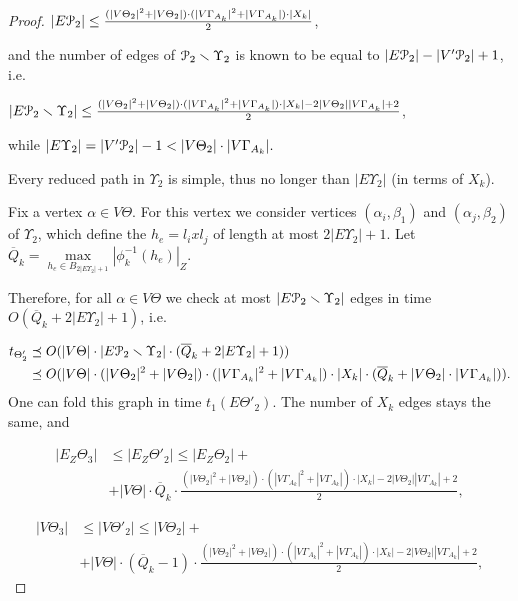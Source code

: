 \documentclass[a4paper,12pt]{article}
\renewcommand{\a}{\alpha }
\renewcommand{\b}{\beta }
\newcommand{\G}{\Gamma }
\newcommand{\T}{\Theta }
\newcommand{\U}{\Upsilon }
\newcommand{\cP}{{\cal{P}}}
\numberwithin{equation}{section}
\numberwithin{figure}{section}
\begin{document}
\begin{proof}
$|E\cP_2| \le \frac{(|V\T_2|^2+|V\T_2|)\cdot
(|V\G_{A_k}|^2+|V\G_{A_k}|) \cdot |X_k|}{2}$,

and the number of edges of $\cP_2 \smallsetminus \U_2$ is known to
be equal to $|E\cP_2| - |V'\cP_2|+1$, i.e.

$|E\cP_2\smallsetminus \U_2| \le \frac{(|V\T_2|^2+|V\T_2|)\cdot
(|V\G_{A_k}|^2+|V\G_{A_k}|) \cdot |X_k| -2|V\T_2||V\G_{A_k}|+2
}{2}$,

while $|E \U_2| = |V'\cP_2| - 1 < |V\T_2|\cdot |V \G_{A_k}|.$

Every reduced path in $\U_2$ is simple, thus no longer than
$|E\U_2|$ (in terms of $X_k$).

Fix a vertex $\a \in V\T$. For this vertex we consider vertices
$(\a_i,\b_1)$ and $(\a_j,\b_2)$ of $\U_2$, which define the
$h_e=l_i x l_j$ of length at most $2 |E \U_2| +1$. Let
$\overline{Q}_k=\mathop{max}\limits_{h_e \in B_{2|E \U_2|
+1}}|\phi^{-1}_k(h_e)|_Z$.

Therefore, for all $\a \in V\T$ we check at most
$|E\cP_2\smallsetminus \U_2|$ edges in time $O(\overline{Q}_k+2 |E
\U_2| +1)$, i.e.


\begin{equation}\label{theta'2}
\begin{split}
t_{\T'_2} &\preceq O(|V\T|\cdot |E\cP_2\smallsetminus \U_2|\cdot
(\overline{Q}_k+2 |E \U_2| +1))\\ &\preceq O(|V\T|\cdot
(|V\T_2|^2+|V\T_2|)\cdot (|V\G_{A_k}|^2+|V\G_{A_k}|) \cdot |X_k|
\cdot (\overline{Q}_k+|V\T_2|\cdot |V \G_{A_k}|)).
\end{split}
\end{equation}
One can fold this graph in time $t_1(E\T'_2)$. The number of $X_k$
edges stays the same, and

\begin{equation}\label{eztheta3}
\begin{split}
|E_Z\T_3| &\le |E_Z\T'_2|\le |E_Z\T_2|+\\ &+|V\T|\cdot
\overline{Q}_k\cdot \frac{(|V\T_2|^2+|V\T_2|)\cdot
(|V\G_{A_k}|^2+|V\G_{A_k}|) \cdot |X_k|
-2|V\T_2||V\G_{A_k}|+2}{2},
\end{split}
\end{equation}

\begin{equation}\label{vtheta3}
\begin{split}
|V\T_3| &\le |V \T'_2|\le |V\T_2|+\\
&+|V\T|\cdot(\overline{Q}_k-1)\cdot \frac{(|V\T_2|^2+|V\T_2|)\cdot
(|V\G_{A_k}|^2+|V\G_{A_k}|) \cdot |X_k| -2|V\T_2||V\G_{A_k}|+2
}{2},
\end{split}
\end{equation}


\end{proof}
\end{document}
